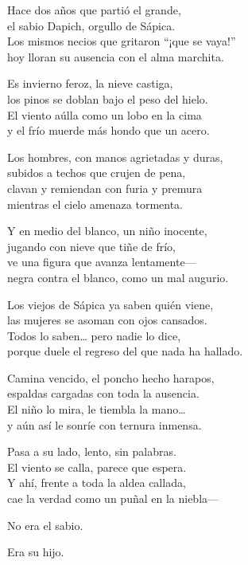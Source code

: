 \begin{lyrics}
Hace dos años que partió el grande,\\
el sabio Dapich, orgullo de Sápica.\\
Los mismos necios que gritaron “¡que se vaya!”\\
hoy lloran su ausencia con el alma marchita.

Es invierno feroz, la nieve castiga,\\
los pinos se doblan bajo el peso del hielo.\\
El viento aúlla como un lobo en la cima\\
y el frío muerde más hondo que un acero.

Los hombres, con manos agrietadas y duras,\\
subidos a techos que crujen de pena,\\
clavan y remiendan con furia y premura\\
mientras el cielo amenaza tormenta.

Y en medio del blanco, un niño inocente,\\
jugando con nieve que tiñe de frío,\\
ve una figura que avanza lentamente—\\
negra contra el blanco, como un mal augurio.

Los viejos de Sápica ya saben quién viene,\\
las mujeres se asoman con ojos cansados.\\
Todos lo saben… pero nadie lo dice,\\
porque duele el regreso del que nada ha hallado.

Camina vencido, el poncho hecho harapos,\\
espaldas cargadas con toda la ausencia.\\
El niño lo mira, le tiembla la mano…\\
y aún así le sonríe con ternura inmensa.

Pasa a su lado, lento, sin palabras.\\
El viento se calla, parece que espera.\\
Y ahí, frente a toda la aldea callada,\\
cae la verdad como un puñal en la niebla—

No era el sabio.

Era su hijo.

\end{lyrics}

